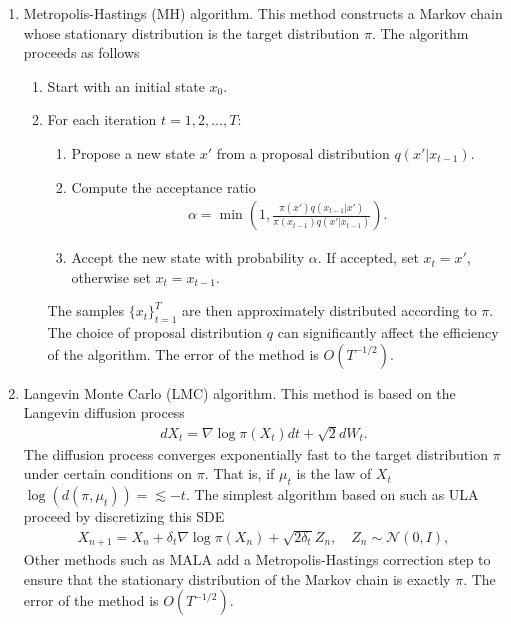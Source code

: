 \documentclass[
    a4paper,
    DIV=14,
    abstract=true,
    numbers=noenddot
]
{scrartcl}
\theoremstyle{definition}
\newcommand{\Nn}{\mathcal{N}}
\begin{document}
\begin{enumerate}
    \item Metropolis-Hastings (MH) algorithm. This method constructs a Markov chain whose stationary distribution is the target distribution $\pi$. The algorithm proceeds as follows 
    \begin{enumerate}
        \item Start with an initial state $x_0$.
        \item For each iteration $t = 1, 2, \ldots, T$:
        \begin{enumerate}
            \item Propose a new state $x'$ from a proposal distribution $q(x'|x_{t-1})$.
            \item Compute the acceptance ratio
            \begin{align*}
                \alpha = \min\left(1, \frac{\pi(x') q(x_{t-1}|x')}{\pi(x_{t-1}) q(x'|x_{t-1})}\right).
            \end{align*}
            \item Accept the new state with probability $\alpha$. If accepted, set $x_t = x'$, otherwise set $x_t = x_{t-1}$.
        \end{enumerate}
        The samples $\{x_t\}_{t=1}^T$ are then approximately distributed according to $\pi$. The choice of proposal distribution $q$ can significantly affect the efficiency of the algorithm. The error of the method is $O(T^{-1/2})$.
\end{enumerate}
\item Langevin Monte Carlo (LMC) algorithm. This method is based on the Langevin diffusion process
\begin{align}\label{Langevin SDE}
    dX_t = \nabla \log \pi(X_t) dt + \sqrt{2}  dW_t.
\end{align}
The diffusion process converges exponentially fast to the target distribution $\pi$ under certain conditions on $\pi$. That is, if $\mu _t$ is the law of $X_t$   $\log(d(\pi, \mu _t)) =\lesssim -t$.  The simplest algorithm based on  such as ULA proceed by discretizing this SDE 
\begin{align*}
    X_{n+1} = X_n + \delta_t \nabla \log \pi(X_n) + \sqrt{2\delta_t} Z_n, \quad Z_n \sim \Nn(0, I),
\end{align*}
Other methods such as MALA add a Metropolis-Hastings correction step to ensure that the stationary distribution of the Markov chain is exactly $\pi$. The error of the method is $O(T^{-1/2})$.
\end{enumerate}
\end{document}
